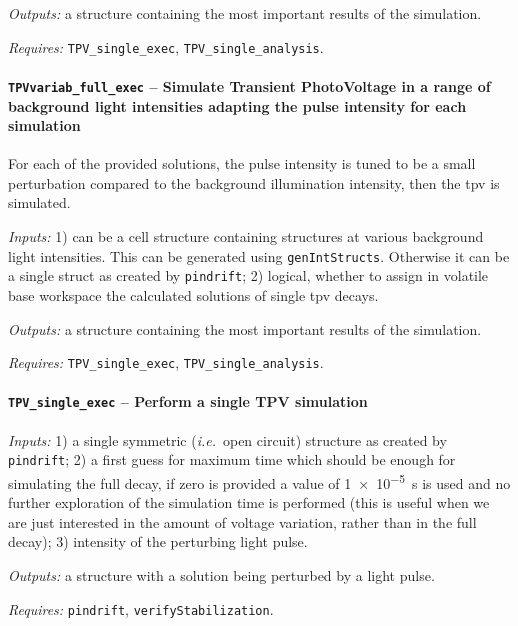 		\textit{Outputs:} a structure containing the most important results of the simulation.
		
		\textit{Requires:} \texttt{TPV\_single\_exec}, \texttt{TPV\_single\_analysis}.
		
		
		
				\paragraph{\texttt{TPV\-variab\_full\_exec} -- Simulate Transient PhotoVoltage in a range of background light intensities adapting the pulse intensity for each simulation}
				For each of the provided solutions, the pulse intensity is tuned to be a small perturbation compared to the background illumination intensity, then the \gls{tpv} is simulated.
				
				\textit{Inputs:} 1) can be a cell structure containing structures at various background
				light intensities. This can be generated using \texttt{gen\-Int\-Structs}.
				Otherwise it can be a single struct as created by \texttt{pin\-drift};
				2) logical, whether to assign in volatile base
				workspace the calculated solutions of single \gls{tpv} decays.
				
				\textit{Outputs:} a structure containing the most important results of the simulation.
				
				\textit{Requires:} \texttt{TPV\_single\_exec}, \texttt{TPV\_single\_analysis}.
		
		
		\paragraph{\texttt{TPV\_single\_exec} -- Perform a single TPV simulation}
		
		\textit{Inputs:} 1) a single symmetric (\textsl{i.e.}\ open circuit) structure as created by \texttt{pin\-drift};
		2) a first guess for maximum time which should be enough for simulating the full decay, if zero is provided a value of \SI{1e-5}{\s} is used and no further exploration of the simulation time is performed (this is useful when we are just interested in the amount of voltage variation, rather than in the full decay);
		3) intensity of the perturbing light pulse.
		
		\textit{Outputs:} a structure with a solution being perturbed by a light pulse.
		
		\textit{Requires:} \texttt{pin\-drift}, \texttt{verify\-Stabilization}.
		
